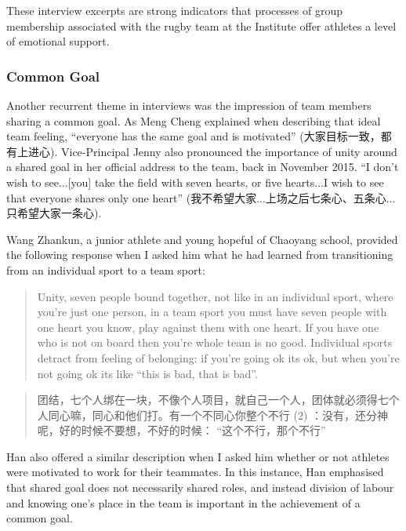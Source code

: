 \begin{CJK}{UTF8}{gbsn}
These interview excerpts are strong indicators that processes of group membership associated with the rugby team at the Institute offer athletes a level of emotional support.



\subsubsection{Common Goal}

Another recurrent theme in interviews was the impression of team members sharing a common goal.  As Meng Cheng explained when describing that ideal team feeling, ``everyone has the same goal and is motivated'' (大家目标一致，都有上进心). Vice-Principal Jenny also pronounced the importance of unity around a shared goal in her official address to the team, back in November 2015.  ``I don't wish to see...[you] take the field with seven hearts, or five hearts...I wish to see that everyone shares only one heart'' (我不希望大家...上场之后七条心、五条心...只希望大家一条心).

Wang Zhankun, a junior athlete and young hopeful of Chaoyang school, provided the following response when I asked him what he had learned from transitioning from an individual sport to a team sport:

  \begin{quotation}
    Unity, seven people bound together, not like in an individual sport, where you’re just one person, in a team sport you must have seven people with one heart you know, play against them with one heart.  If you have one who is not on board then you’re whole team is no good. Individual sports detract from feeling of belonging: if you’re going ok its ok, but when you’re not going ok its like ``this is bad, that is bad''.
  \end{quotation}

  \begin{quotation}
    团结，七个人绑在一块，不像个人项目，就自己一个人，团体就必须得七个人同心嘛，同心和他们打。有一个不同心你整个不行 (2) ：没有，还分神呢，好的时候不要想，不好的时候： ``这个不行，那个不行''
  \end{quotation}

  Han also offered a similar description when I asked him whether or not athletes were motivated to work for their teammates. In this instance, Han emphasised that shared goal does not necessarily shared roles, and instead division of labour and knowing one's place in the team is important in the achievement of a common goal.


\end{CJK}
